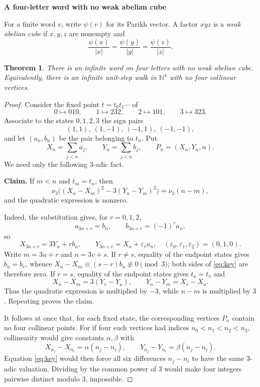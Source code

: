 \documentclass[11pt]{article}
\newtheorem*{theorem}{Theorem}
\newcommand{\N}{\mathbb N}
\newcommand{\Par}{\psi}
\begin{document}
\begin{center}
{\Large\bfseries A four-letter word with no weak abelian cube}
\end{center}

For a finite word $v$, write $\Par(v)$ for its Parikh vector.  A factor
$xyz$ is a \emph{weak abelian cube} if $x,y,z$ are nonempty and
\[
 \frac{\Par(x)}{|x|}=\frac{\Par(y)}{|y|}=\frac{\Par(z)}{|z|}.
\]

\begin{theorem}
There is an infinite word on four letters with no weak abelian cube.
Equivalently, there is an infinite unit-step walk in $\N^4$ with no four
collinear vertices.
\end{theorem}

\begin{proof}
Consider the fixed point $t=t_0t_1\cdots$ of
\[
 0\mapsto010,\qquad1\mapsto232,\qquad
 2\mapsto101,\qquad3\mapsto323.
\]
Associate to the states $0,1,2,3$ the sign pairs
\[
 (1,1),\ (1,-1),\ (-1,1),\ (-1,-1),
\]
and let $(a_n,b_n)$ be the pair belonging to $t_n$.  Put
\[
 X_n=\sum_{j<n}a_j,\qquad Y_n=\sum_{j<n}b_j,
 \qquad P_n=(X_n,Y_n,n).
\]
We need only the following $3$-adic fact.

\medskip
\noindent\textbf{Claim.} If $m<n$ and $t_m=t_n$, then
\begin{equation}\label{eq:key}
 \nu_3\bigl((X_n-X_m)^2-3(Y_n-Y_m)^2\bigr)=\nu_3(n-m),
\end{equation}
and the quadratic expression is nonzero.

Indeed, the substitution gives, for $r=0,1,2$,
\[
 a_{3n+r}=b_n,\qquad b_{3n+r}=(-1)^r a_n,
\]
so
\[
 X_{3n+r}=3Y_n+r b_n,
 \qquad
 Y_{3n+r}=X_n+\varepsilon_r a_n,
 \quad(\varepsilon_0,\varepsilon_1,\varepsilon_2)=(0,1,0).
\]
Write $m=3u+r$ and $n=3v+s$.  If $r\ne s$, equality of the endpoint
states gives $b_u=b_v$, whence
$X_n-X_m\equiv(s-r)b_u\not\equiv0\pmod3$; both sides of
\eqref{eq:key} are therefore zero.  If $r=s$, equality of the endpoint
states gives $t_u=t_v$ and
\[
 X_n-X_m=3(Y_v-Y_u),\qquad Y_n-Y_m=X_v-X_u.
\]
Thus the quadratic expression is multiplied by $-3$, while $n-m$ is
multiplied by $3$.  Repeating proves the claim.

It follows at once that, for each fixed state, the corresponding vertices
$P_n$ contain no four collinear points.  For if four such vertices had
indices $n_0<n_1<n_2<n_3$, collinearity would give constants
$\alpha,\beta$ with
\[
 X_{n_j}-X_{n_i}=\alpha(n_j-n_i),\qquad
 Y_{n_j}-Y_{n_i}=\beta(n_j-n_i).
\]
Equation \eqref{eq:key} would then force all six differences $n_j-n_i$
to have the same $3$-adic valuation.  Dividing by the common power of $3$
would make four integers pairwise distinct modulo $3$, impossible.


\end{proof}
\end{document}
